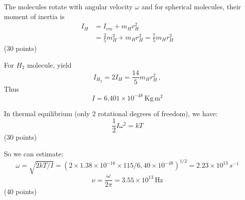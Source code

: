 The molecules rotate with angular velocity $\omega$ and for spherical
molecules, their moment of inertia is
\begin{align*}
  I_H &= I_{cm} + m_H r_H^2\\
      &= \frac{2}{5}m_H^2 + m_H r_H^2 = \frac{7}{5}m_H r_H^2
\end{align*}
\hfill(30 points)

For $H_2$ molecule, yield
\[
  I_{H_2} = 2I_H = \frac{14}{5}m_H r_H^2\,,
\]
Thus
\[
  I = 6.401\times10^{-48}\ \mathrm{Kg\,m^2}
\]

In thermal equilibrium (only 2 rotational degrees of freedom), we have:
\[
  \frac{1}{2}I\omega^2 = kT
\]
\hfill(30 points)

So we can estimate:
\[
  \omega = \sqrt{2kT/I}
  = (2 \times 1.38\times10^{-16} \times 115/6{,}40\times10^{-48})^{1/2}
  = 2.23\times10^{13}\,s^{-1}
\]
\[
  \nu = \frac{\omega}{2\pi} = 3.55\times10^{13}\,\mathrm{Hz}
\]
\hfill(40 points)
